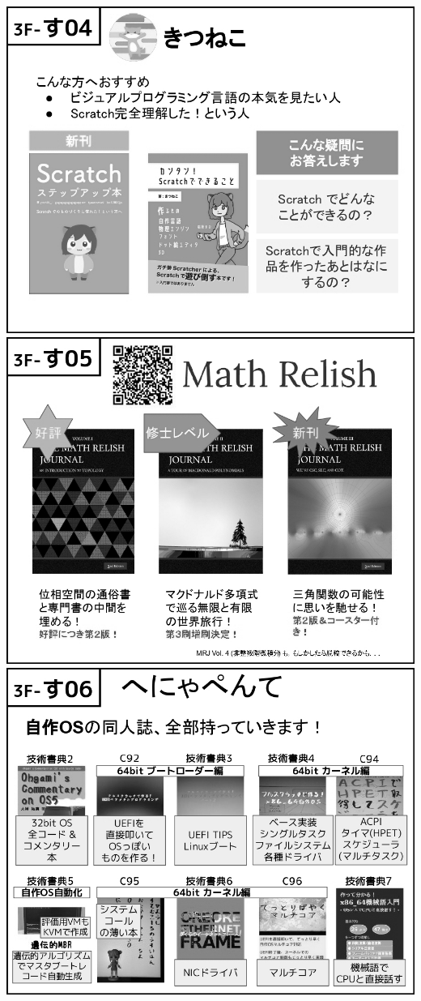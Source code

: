 \begin{center}
\includegraphics[width=0.9\linewidth]{images/circle-appeals/3F-す04.jpg}
\includegraphics[width=0.9\linewidth]{images/circle-appeals/3F-す05.jpg}
\includegraphics[width=0.9\linewidth]{images/circle-appeals/3F-す06.jpg}

\end{center}
